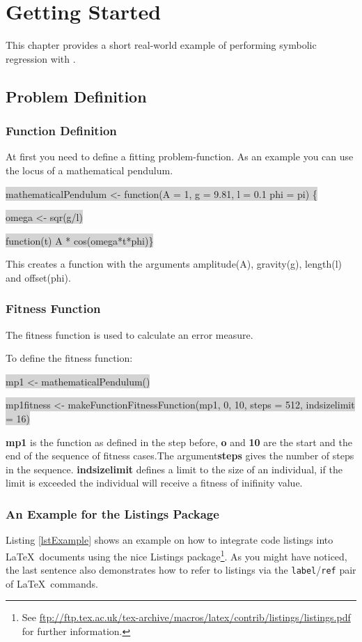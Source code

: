 
\chapter{Getting Started}
This chapter provides a short real-world example of performing symbolic regression with \RGP.


\section{Problem Definition}

\subsection{Function Definition}
At first you need to define a fitting problem-function.
As an example you can use the locus of a mathematical pendulum.

\colorbox{lightgray}{mathematicalPendulum <- function(A = 1, g = 9.81, l = 0.1 phi = pi) \{}

\colorbox{lightgray}{omega <- sqr(g/l)}

\colorbox{lightgray}{function(t) A * cos(omega*t*phi)\}} 

This creates a function with the arguments amplitude(A), gravity(g), length(l) and offset(phi).

\subsection{Fitness Function}
The fitness function is used to calculate an error measure.

To define the fitness function:

\colorbox{lightgray}{mp1 <- mathematicalPendulum()}

\colorbox{lightgray}{mp1fitness <- makeFunctionFitnessFunction(mp1, 0, 10, steps = 512, indsizelimit = 16)}

{\bf mp1} is the function as defined in the step before, {\bf o} and {\bf 10} are the start and the 
end of the sequence of fitness cases.The argument{\bf steps} gives the number of steps in the sequence.
{\bf indsizelimit} defines a limit to the size of an individual,
if the limit is exceeded the individual will receive a fitness of inifinity value. 

\subsection{An Example for the Listings Package} %
Listing \ref{lstExample} shows an example on how to integrate \R code listings into \LaTeX~documents
using the nice {\sf Listings} package\footnote{See
  \url{ftp://ftp.tex.ac.uk/tex-archive/macros/latex/contrib/listings/listings.pdf} for further
  information.}. As you might have noticed, the last sentence also demonstrates how to refer to
listings via the {\tt label}/{\tt ref} pair of \LaTeX~commands.

